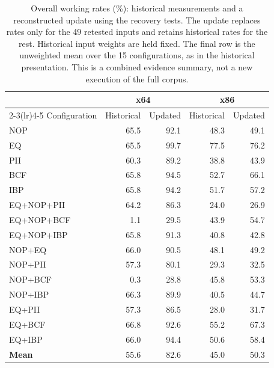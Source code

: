 \begin{table}[t]
\caption{Overall working rates (\%): historical measurements and a
reconstructed update using the recovery tests. The update replaces rates
only for the 49 retested inputs and retains historical rates for the rest.
Historical input weights are held fixed. The final row is the unweighted
mean over the 15 configurations, as in the historical presentation.
This is a combined evidence summary, not a new execution of the full corpus.}
\label{tab:overall_working_update}
\centering\small\setlength{\tabcolsep}{5pt}
\begin{tabular}{@{}lrrrr@{}}
\toprule
 & \multicolumn{2}{c}{x64} & \multicolumn{2}{c}{x86} \\
\cmidrule(lr){2-3}\cmidrule(lr){4-5}
Configuration & Historical & Updated & Historical & Updated \\
\midrule
NOP & 65.5 & 92.1 & 48.3 & 49.1 \\
EQ & 65.5 & 99.7 & 77.5 & 76.2 \\
PII & 60.3 & 89.2 & 38.8 & 43.9 \\
BCF & 65.8 & 94.5 & 52.7 & 66.1 \\
IBP & 65.8 & 94.2 & 51.7 & 57.2 \\
EQ+NOP+PII & 64.2 & 86.3 & 24.0 & 26.9 \\
EQ+NOP+BCF & 1.1 & 29.5 & 43.9 & 54.7 \\
EQ+NOP+IBP & 65.8 & 91.3 & 40.8 & 42.8 \\
NOP+EQ & 66.0 & 90.5 & 48.1 & 49.2 \\
NOP+PII & 57.3 & 80.1 & 29.3 & 32.5 \\
NOP+BCF & 0.3 & 28.8 & 45.8 & 53.3 \\
NOP+IBP & 66.3 & 89.9 & 40.5 & 44.7 \\
EQ+PII & 57.3 & 86.5 & 28.0 & 31.7 \\
EQ+BCF & 66.8 & 92.6 & 55.2 & 67.3 \\
EQ+IBP & 66.0 & 94.4 & 50.6 & 58.4 \\
\midrule
\textbf{Mean} & 55.6 & 82.6 & 45.0 & 50.3 \\
\bottomrule
\end{tabular}
\end{table}
